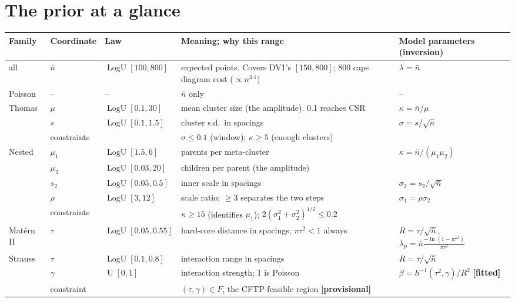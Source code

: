 \documentclass[10pt,a4paper]{article}
\newcommand{\fitted}{\textcolor{orange!85!black}{\textbf{[fitted]}}}
\newcommand{\prov}{\textcolor{orange!85!black}{\textbf{[provisional]}}}
\newcommand{\nbar}{\bar n}
\newcommand{\LogU}{\operatorname{LogU}}
\newcommand{\Unif}{\operatorname{U}}
\begin{document}
\section{The prior at a glance}\label{sec:prior}

\begin{table}[ht]
\centering\small
\begin{tabularx}{\linewidth}{@{}l l l L L@{}}
\toprule
Family & Coordinate & Law & Meaning; why this range & Model parameters (inversion)\\
\midrule
all & $\nbar$ & $\LogU[100,800]$ & expected points. Covers DV1's $[150,800]$; 800 caps diagram cost ($\propto n^{3.1}$) & $\lambda=\nbar$\\
\addlinespace
Poisson & -- & -- & $\nbar$ only & --\\
\addlinespace
Thomas & $\mu$ & $\LogU[0.1,30]$ & mean cluster size (the amplitude). 0.1 reaches CSR & $\kappa=\nbar/\mu$\\
 & $s$ & $\LogU[0.1,1.5]$ & cluster s.d.\ in spacings & $\sigma=s/\sqrt{\nbar}$\\
 & constraints & & $\sigma\le0.1$ (window); $\kappa\ge5$ (enough clusters) & \\
\addlinespace
Nested & $\mu_1$ & $\LogU[1.5,6]$ & parents per meta-cluster & $\kappa=\nbar/(\mu_1\mu_2)$\\
 & $\mu_2$ & $\LogU[0.03,20]$ & children per parent (the amplitude) & \\
 & $s_2$ & $\LogU[0.05,0.5]$ & inner scale in spacings & $\sigma_2=s_2/\sqrt{\nbar}$\\
 & $\rho$ & $\LogU[3,12]$ & scale ratio; $\ge3$ separates the two steps & $\sigma_1=\rho\sigma_2$\\
 & constraints & & $\kappa\ge15$ (identifies $\mu_1$); $2(\sigma_1^2+\sigma_2^2)^{1/2}\le0.2$ & \\
\addlinespace
Mat\'ern II & $\tau$ & $\LogU[0.05,0.55]$ & hard-core distance in spacings; $\pi\tau^2<1$ always & $R=\tau/\sqrt{\nbar}$, $\lambda_p=\nbar\frac{-\ln(1-\pi\tau^2)}{\pi\tau^2}$\\
\addlinespace
Strauss & $\tau$ & $\LogU[0.1,0.8]$ & interaction range in spacings & $R=\tau/\sqrt{\nbar}$\\
 & $\gamma$ & $\Unif[0,1]$ & interaction strength; 1 is Poisson & $\beta=h^{-1}(\tau^2,\gamma)/R^2$ \fitted\\
 & constraint & & $(\tau,\gamma)\in F$, the CFTP-feasible region \prov & \\

\end{tabularx}
\end{table}
\end{document}
